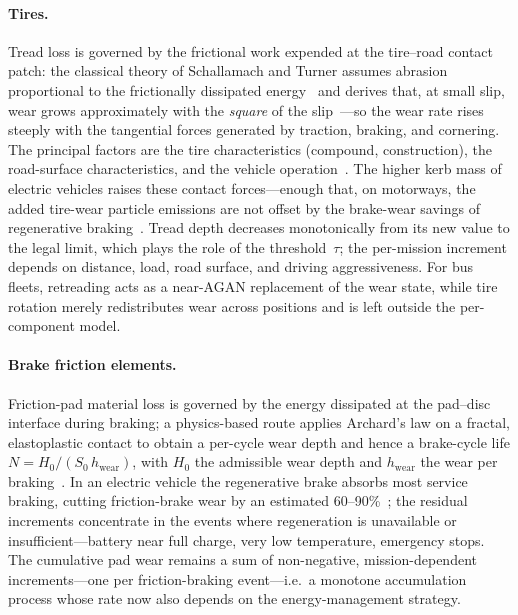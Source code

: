 \documentclass[11pt,a4paper]{article}
\theoremstyle{plain}
\theoremstyle{definition}
\theoremstyle{remark}
\begin{document}
\paragraph{Tires.}
Tread loss is governed by the frictional work expended at the tire--road contact patch: the classical theory of Schallamach and Turner assumes abrasion proportional to the frictionally dissipated energy~\cite[Eq.~7]{SchallamachTurner1960} and derives that, at small slip, wear grows approximately with the \emph{square} of the slip~\cite[Eq.~19]{SchallamachTurner1960}---so the wear rate rises steeply with the tangential forces generated by traction, braking, and cornering.
The principal factors are the tire characteristics (compound, construction), the road-surface characteristics, and the vehicle operation~\cite[Sec.~2.1.2]{Fussell2022}.
The higher kerb mass of electric vehicles raises these contact forces---enough that, on motorways, the added tire-wear particle emissions are not offset by the brake-wear savings of regenerative braking~\cite[Sec.~6.1]{Fussell2022}.
Tread depth decreases monotonically from its new value to the legal limit, which plays the role of the threshold~$\tau$; the per-mission increment depends on distance, load, road surface, and driving aggressiveness.
For bus fleets, retreading acts as a near-AGAN replacement of the wear state, while tire rotation merely redistributes wear across positions and is left outside the per-component model.

\paragraph{Brake friction elements.}
Friction-pad material loss is governed by the energy dissipated at the pad--disc interface during braking; a physics-based route applies Archard's law on a fractal, elastoplastic contact to obtain a per-cycle wear depth and hence a brake-cycle life $N = H_0/(S_0\,h_{\mathrm{wear}})$, with $H_0$ the admissible wear depth and $h_{\mathrm{wear}}$ the wear per braking~\cite[Eqs.~14,~22]{Sha2022}.
In an electric vehicle the regenerative brake absorbs most service braking, cutting friction-brake wear by an estimated 60--90\%~\cite[Sec.~6.1]{Fussell2022}; the residual increments concentrate in the events where regeneration is unavailable or insufficient---battery near full charge, very low temperature, emergency stops.
The cumulative pad wear remains a sum of non-negative, mission-dependent increments---one per friction-braking event---i.e.\ a monotone accumulation process whose rate now also depends on the energy-management strategy.
\end{document}
